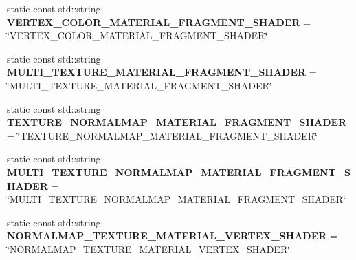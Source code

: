 \begin{DoxyCompactItemize}
\item 
\mbox{\label{struct_geometry_engine_1_1_geometry_material_1_1_material_constants_ab41d4bdc065ffcc53fc552b1e2a70209}} 
static const std\+::string {\bfseries V\+E\+R\+T\+E\+X\+\_\+\+C\+O\+L\+O\+R\+\_\+\+M\+A\+T\+E\+R\+I\+A\+L\+\_\+\+F\+R\+A\+G\+M\+E\+N\+T\+\_\+\+S\+H\+A\+D\+ER} = \char`\"{}V\+E\+R\+T\+E\+X\+\_\+\+C\+O\+L\+O\+R\+\_\+\+M\+A\+T\+E\+R\+I\+A\+L\+\_\+\+F\+R\+A\+G\+M\+E\+N\+T\+\_\+\+S\+H\+A\+D\+ER\char`\"{}
\item 
\mbox{\label{struct_geometry_engine_1_1_geometry_material_1_1_material_constants_ae16d3d3dccfe15e09f212f09630ff0e2}} 
static const std\+::string {\bfseries M\+U\+L\+T\+I\+\_\+\+T\+E\+X\+T\+U\+R\+E\+\_\+\+M\+A\+T\+E\+R\+I\+A\+L\+\_\+\+F\+R\+A\+G\+M\+E\+N\+T\+\_\+\+S\+H\+A\+D\+ER} = \char`\"{}M\+U\+L\+T\+I\+\_\+\+T\+E\+X\+T\+U\+R\+E\+\_\+\+M\+A\+T\+E\+R\+I\+A\+L\+\_\+\+F\+R\+A\+G\+M\+E\+N\+T\+\_\+\+S\+H\+A\+D\+ER\char`\"{}
\item 
\mbox{\label{struct_geometry_engine_1_1_geometry_material_1_1_material_constants_adbf507230da48d440a5493caad1d7e1a}} 
static const std\+::string {\bfseries T\+E\+X\+T\+U\+R\+E\+\_\+\+N\+O\+R\+M\+A\+L\+M\+A\+P\+\_\+\+M\+A\+T\+E\+R\+I\+A\+L\+\_\+\+F\+R\+A\+G\+M\+E\+N\+T\+\_\+\+S\+H\+A\+D\+ER} = \char`\"{}T\+E\+X\+T\+U\+R\+E\+\_\+\+N\+O\+R\+M\+A\+L\+M\+A\+P\+\_\+\+M\+A\+T\+E\+R\+I\+A\+L\+\_\+\+F\+R\+A\+G\+M\+E\+N\+T\+\_\+\+S\+H\+A\+D\+ER\char`\"{}
\item 
\mbox{\label{struct_geometry_engine_1_1_geometry_material_1_1_material_constants_a08e829164fa079343d7231ce94ed9f69}} 
static const std\+::string {\bfseries M\+U\+L\+T\+I\+\_\+\+T\+E\+X\+T\+U\+R\+E\+\_\+\+N\+O\+R\+M\+A\+L\+M\+A\+P\+\_\+\+M\+A\+T\+E\+R\+I\+A\+L\+\_\+\+F\+R\+A\+G\+M\+E\+N\+T\+\_\+\+S\+H\+A\+D\+ER} = \char`\"{}M\+U\+L\+T\+I\+\_\+\+T\+E\+X\+T\+U\+R\+E\+\_\+\+N\+O\+R\+M\+A\+L\+M\+A\+P\+\_\+\+M\+A\+T\+E\+R\+I\+A\+L\+\_\+\+F\+R\+A\+G\+M\+E\+N\+T\+\_\+\+S\+H\+A\+D\+ER\char`\"{}
\item 
\mbox{\label{struct_geometry_engine_1_1_geometry_material_1_1_material_constants_ae9a699f5019d0d6c5b65af60ad6cd6cb}} 
static const std\+::string {\bfseries N\+O\+R\+M\+A\+L\+M\+A\+P\+\_\+\+T\+E\+X\+T\+U\+R\+E\+\_\+\+M\+A\+T\+E\+R\+I\+A\+L\+\_\+\+V\+E\+R\+T\+E\+X\+\_\+\+S\+H\+A\+D\+ER} = \char`\"{}N\+O\+R\+M\+A\+L\+M\+A\+P\+\_\+\+T\+E\+X\+T\+U\+R\+E\+\_\+\+M\+A\+T\+E\+R\+I\+A\+L\+\_\+\+V\+E\+R\+T\+E\+X\+\_\+\+S\+H\+A\+D\+ER\char`\"{}
\end{DoxyCompactItemize}


